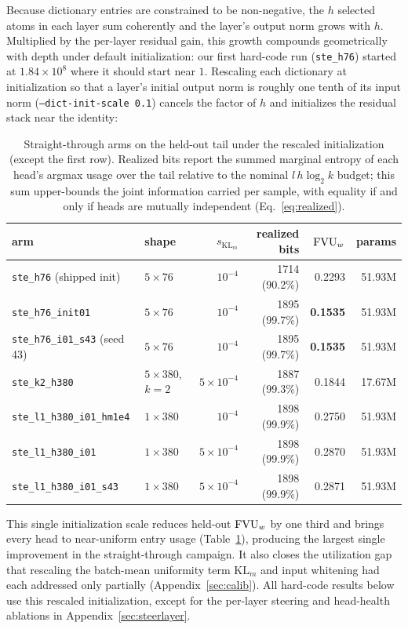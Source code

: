 Because dictionary entries are constrained to be non-negative, the $h$
selected atoms in each layer sum coherently and the layer's output norm
grows with $h$. Multiplied by the per-layer residual gain, this growth
compounds geometrically with depth under default initialization: our first
hard-code run (\texttt{ste\_h76}) started at $1.84\times10^8$ where it
should start near $1$. Rescaling each dictionary at initialization so that a
layer's initial output norm is roughly one tenth of its input norm
(\texttt{--dict-init-scale 0.1}) cancels the factor of $h$ and initializes
the residual stack near the identity:

\begin{table}[htbp]\centering\small
\begin{tabular}{@{}llrrrr@{}}
\toprule
arm & shape & $s_{\mathrm{KL}_m}$ & realized bits & $\mathrm{FVU}_w$ & params \\
\midrule
\texttt{ste\_h76} (shipped init)    & $5\times76$ & $10^{-4}$ & 1714 (90.2\%) & 0.2293 & 51.93M \\
\texttt{ste\_h76\_init01}            & $5\times76$ & $10^{-4}$ & 1895 (99.7\%) & \textbf{0.1535} & 51.93M \\
\texttt{ste\_h76\_i01\_s43} (seed 43) & $5\times76$ & $10^{-4}$ & 1895 (99.7\%) & \textbf{0.1535} & 51.93M \\
\texttt{ste\_k2\_h380}               & $5\times380$, $k{=}2$ & $5\times10^{-4}$ & 1887 (99.3\%) & 0.1844 & 17.67M \\
\texttt{ste\_l1\_h380\_i01\_hm1e4}   & $1\times380$ & $10^{-4}$ & 1898 (99.9\%) & 0.2750 & 51.93M \\
\texttt{ste\_l1\_h380\_i01}          & $1\times380$ & $5\times10^{-4}$ & 1898 (99.9\%) & 0.2870 & 51.93M \\
\texttt{ste\_l1\_h380\_i01\_s43}     & $1\times380$ & $5\times10^{-4}$ & 1898 (99.9\%) & 0.2871 & 51.93M \\
\bottomrule
\end{tabular}
\caption{Straight-through arms on the held-out tail under the rescaled
initialization (except the first row). Realized bits report the summed
marginal entropy of each head's argmax usage over the tail relative to the
nominal $l\,h\log_2 k$ budget; this sum upper-bounds the joint information
carried per sample, with equality if and only if heads are mutually
independent (Eq.~\eqref{eq:realized}).}
\label{tab:init}
\end{table}

This single initialization scale reduces held-out $\mathrm{FVU}_w$ by one third and
brings every head to near-uniform entry usage (Table~\ref{tab:init}),
producing the largest single improvement in the straight-through campaign.
It also closes the utilization gap that rescaling the batch-mean uniformity
term $\mathrm{KL}_m$ and input whitening had each addressed only partially
(Appendix~\ref{sec:calib}). All hard-code results below use this rescaled
initialization, except for the per-layer steering and head-health ablations
in Appendix~\ref{sec:steerlayer}.

